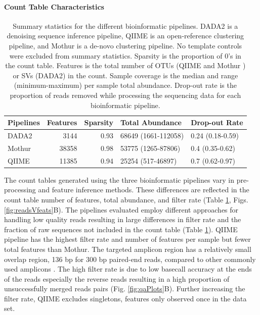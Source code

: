 \documentclass{bmcart}
\begin{document}
\paragraph{Count Table Characteristics}
\begin{table}
\caption{\label{tab:pipeQA}Summary statistics for the different bioinformatic pipelines.
DADA2 is a denoising sequence inference pipeline, QIIME is an open-reference clustering
pipeline, and Mothur  is a de-novo clustering pipeline. No template controls were excluded
from summary statistics. Sparsity is the proportion of 0's in the count table. Features
is the total number of OTUs (QIIME and Mothur ) or SVs (DADA2) in the count. Sample
coverage is the median and range (minimum-maximum) per sample total abundance.
Drop-out rate is the proportion of reads removed while processing the sequencing data for each bioinformatic pipeline.}
\centering
\begin{tabular}[t]{lrrll}
\toprule
Pipelines & Features & Sparsity & Total Abundance & Drop-out Rate\\
\midrule
DADA2 & 3144 & 0.93 & 68649 (1661-112058) & 0.24 (0.18-0.59)\\
Mothur & 38358 & 0.98 & 53775 (1265-87806) & 0.4 (0.35-0.62)\\
QIIME & 11385 & 0.94 & 25254 (517-46897) & 0.7 (0.62-0.97)\\
\bottomrule
\end{tabular}
\end{table}



The count tables generated using the three bioinformatic pipelines vary in
pre-processing and feature inference methods. These differences are reflected
in the count table number of features, total abundance,
and filter rate (Table \ref{tab:pipeQA}, Figs. \ref{fig:readsVfeats}B). The
pipelines evaluated employ different approaches for handling low quality
reads resulting in large differences in filter rate and the fraction
of raw sequences not included in the count table (Table
\ref{tab:pipeQA}). QIIME pipeline has the highest filter rate and
number of features per sample but fewer total features than Mothur. The
targeted amplicon region has a relatively small overlap region, 136 bp
for 300 bp paired-end reads, compared to other commonly used amplicons
\cite{kozich2013development, Walters2016-lf}. The high filter rate is
due to low basecall accuracy at the ends of the reads especially the
reverse reads resulting in a high proportion of unsuccessfully merged
reads pairs (Fig. \ref{fig:qaPlots}B). Further increasing the
filter rate, QIIME excludes singletons, features only observed once in
the data set.
\end{document}
